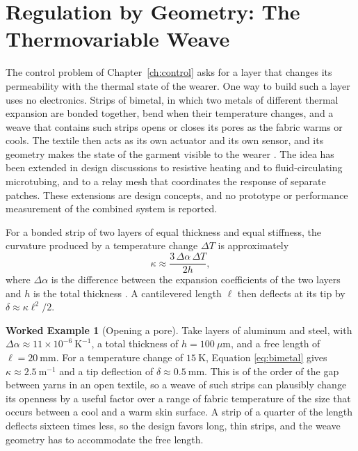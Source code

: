 \documentclass[11pt,openany]{book}
\theoremstyle{definition}
\newtheorem{example}{Worked Example}[chapter]
\theoremstyle{remark}
\begin{document}
\section{Regulation by Geometry: The Thermovariable Weave}

The control problem of Chapter~\ref{ch:control} asks for a layer that changes its permeability with the thermal state of the wearer. One way to build such a layer uses no electronics. Strips of bimetal, in which two metals of different thermal expansion are bonded together, bend when their temperature changes, and a weave that contains such strips opens or closes its pores as the fabric warms or cools. The textile then acts as its own actuator and its own sensor, and its geometry makes the state of the garment visible to the wearer \cite{flyxion2026hl}. The idea has been extended in design discussions to resistive heating and to fluid-circulating microtubing, and to a relay mesh that coordinates the response of separate patches. These extensions are design concepts, and no prototype or performance measurement of the combined system is reported.

For a bonded strip of two layers of equal thickness and equal stiffness, the curvature produced by a temperature change $\Delta T$ is approximately
\begin{equation}
\kappa\approx\frac{3\,\Delta\alpha\,\Delta T}{2h},
\label{eq:bimetal}
\end{equation}
where $\Delta\alpha$ is the difference between the expansion coefficients of the two layers and $h$ is the total thickness \cite{timoshenko1925}. A cantilevered length $\ell$ then deflects at its tip by $\delta\approx\kappa\ell^{2}/2$.

\begin{example}[Opening a pore]
\label{ex:bimetal}
Take layers of aluminum and steel, with $\Delta\alpha\approx11\times10^{-6}\ \mathrm{K^{-1}}$, a total thickness of $h=100\ \mu\mathrm{m}$, and a free length of $\ell=20\ \mathrm{mm}$. For a temperature change of $15\ \mathrm{K}$, Equation \eqref{eq:bimetal} gives $\kappa\approx2.5\ \mathrm{m^{-1}}$ and a tip deflection of $\delta\approx0.5\ \mathrm{mm}$. This is of the order of the gap between yarns in an open textile, so a weave of such strips can plausibly change its openness by a useful factor over a range of fabric temperature of the size that occurs between a cool and a warm skin surface. A strip of a quarter of the length deflects sixteen times less, so the design favors long, thin strips, and the weave geometry has to accommodate the free length.
\end{example}
\end{document}
